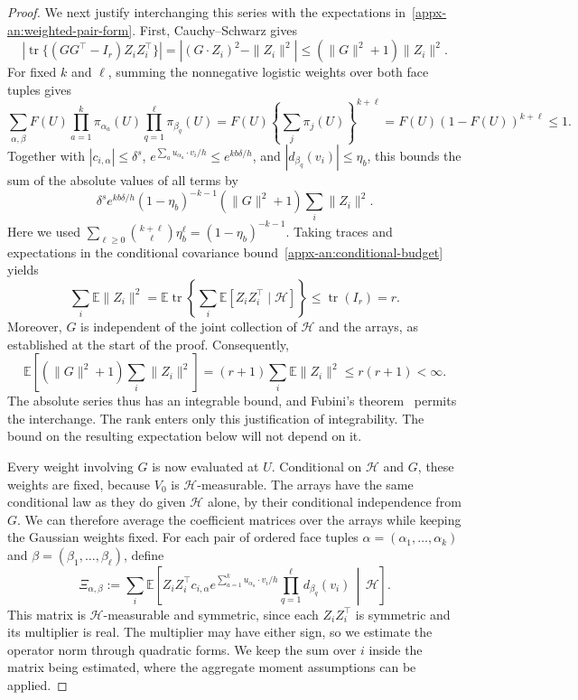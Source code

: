 \documentclass[11pt,letterpaper]{article}
\theoremstyle{remark}
\newcommand{\E}{\mathbb E}
\newcommand{\tr}{\operatorname{tr}}
\begin{document}
\begin{proof}
We next justify interchanging this series with the expectations
in~\eqref{appx-an:weighted-pair-form}. First, Cauchy--Schwarz gives
\[
 \left|\tr\{(GG^\top-I_r)Z_iZ_i^\top\}\right|
 =\left|(G\cdot Z_i)^2-\|Z_i\|^2\right|
 \le(\|G\|^2+1)\|Z_i\|^2.
\]
For fixed $k$ and $\ell$, summing the nonnegative logistic
weights over both face tuples gives
\[
 \sum_{\alpha,\beta}F(U)
    \prod_{a=1}^k\pi_{\alpha_a}(U)
    \prod_{q=1}^\ell\pi_{\beta_q}(U)
 =F(U)\left\{\sum_j\pi_j(U)\right\}^{k+\ell}
 =F(U)(1-F(U))^{k+\ell}\le1.
\]
Together with $|c_{i,\alpha}|\le\delta^s$,
$e^{\sum_a u_{\alpha_a}\cdot v_i/h}\le e^{kb\delta/h}$,
and $|d_{\beta_q}(v_i)|\le\eta_b$, this bounds the sum of the
absolute values of all terms by
\[
 \delta^s e^{kb\delta/h}(1-\eta_b)^{-k-1}
       (\|G\|^2+1)\sum_i\|Z_i\|^2.
\]
Here we used
$\sum_{\ell\ge0}\binom{k+\ell}{\ell}\eta_b^\ell
=(1-\eta_b)^{-k-1}$.
Taking traces and expectations in the conditional covariance
bound~\eqref{appx-an:conditional-budget} yields
\[
 \sum_i\E\|Z_i\|^2
 =\E\tr\left\{\sum_i\E[Z_iZ_i^\top\mid\mathcal H]\right\}
 \le\tr(I_r)=r.
\]
Moreover, $G$ is independent of the joint collection of
$\mathcal H$ and the arrays, as established at the start of the
proof. Consequently,
\[
 \E\left[(\|G\|^2+1)\sum_i\|Z_i\|^2\right]
 =(r+1)\sum_i\E\|Z_i\|^2\le r(r+1)<\infty.
\]
The absolute series thus has an integrable bound, and Fubini's
theorem~\cite[Section~2.5]{Folland1999} permits the interchange.
The rank enters only this justification of integrability. The
bound on the resulting expectation below will not depend on it.

Every weight involving $G$ is now evaluated at $U$. Conditional
on $\mathcal H$ and $G$, these weights are fixed, because $V_0$
is $\mathcal H$-measurable. The arrays have the same conditional
law as they do given $\mathcal H$ alone, by their conditional
independence from $G$. We can therefore average the coefficient
matrices over the arrays while keeping the Gaussian weights
fixed. For each pair of ordered face tuples
$\alpha=(\alpha_1,\ldots,\alpha_k)$ and
$\beta=(\beta_1,\ldots,\beta_\ell)$, define
\[
 \Xi_{\alpha,\beta}:=\sum_i\E\left[
 Z_iZ_i^\top c_{i,\alpha}
 e^{\sum_{a=1}^k u_{\alpha_a}\cdot v_i/h}
 \prod_{q=1}^\ell d_{\beta_q}(v_i)
 \,\middle|\,\mathcal H\right].
\]
This matrix is $\mathcal H$-measurable and symmetric, since each
$Z_iZ_i^\top$ is symmetric and its multiplier is real. The
multiplier may have either sign, so we estimate the operator norm
through quadratic forms. We keep the sum over $i$ inside the
matrix being estimated, where the aggregate moment assumptions
can be applied.


\end{proof}
\end{document}
